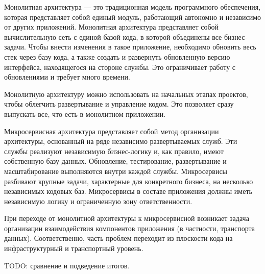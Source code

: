 
Монолитная архитектура --- это традиционная модель программного обеспечения, которая представляет собой единый модуль, работающий автономно и независимо от других приложений. 
Монолитная архитектура представляет собой вычислительную сеть с единой базой кода, в которой объединены все бизнес-задачи. Чтобы внести изменения в такое приложение, необходимо обновить весь стек через базу кода, а также создать и развернуть обновленную версию интерфейса, находящегося на стороне службы. Это ограничивает работу с обновлениями и требует много времени.

Монолитную архитектуру можно использовать на начальных этапах проектов, чтобы облегчить развертывание и управление кодом. Это позволяет сразу выпускать все, что есть в монолитном приложении.


Микросервисная архитектура представляет собой метод организации архитектуры, основанный на ряде независимо развертываемых служб. Эти службы реализуют независимую бизнес-логику и, как правило, имеют собственную базу данных. Обновление, тестирование, развертывание и масштабирование выполняются внутри каждой службы. Микросервисы разбивают крупные задачи, характерные для конкретного бизнеса, на несколько независимых кодовых баз. Микросервисы в составе приложения должны иметь независимую логику и ограниченную зону ответственности.


При переходе от монолитной архитектуры к микросервисной возникает задача организации взаимодействия компонентов приложения (в частности, транспорта данных). Соответственно, часть проблем переходит из плоскости кода на инфраструктурный и транспортный уровень.


TODO: сравнение и подведение итогов.

